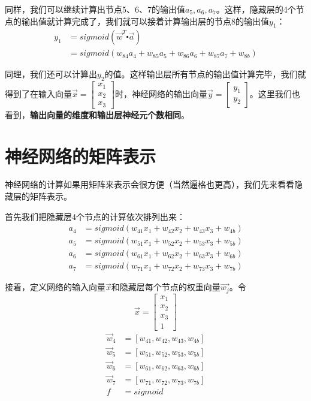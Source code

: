 同样，我们可以继续计算出节点5、6、7的输出值\(a_5,a_6,a_7\)。这样，隐藏层的4个节点的输出值就计算完成了，我们就可以接着计算输出层的节点8的输出值\(y_1\)：
\begin{align*}
	y_1 & =sigmoid(\vec{w}^T\centerdot\vec{a})                     \\
	    & =sigmoid(w_{84}a_4+w_{85}a_5+w_{86}a_6+w_{87}a_7+w_{8b})
\end{align*}

同理，我们还可以计算出\(y_2\)的值。这样输出层所有节点的输出值计算完毕，我们就得到了在输入向量\(\vec{x}=\begin{bmatrix}x_1\\x_2\\x_3\end{bmatrix}\)时，神经网络的输出向量\(\vec{y}=\begin{bmatrix}y_1\\y_2\end{bmatrix}\)。这里我们也看到，\textbf{输出向量的维度和输出层神经元个数相同}。


\section{神经网络的矩阵表示}\label{Bp:4}

神经网络的计算如果用矩阵来表示会很方便（当然逼格也更高），我们先来看看隐藏层的矩阵表示。

首先我们把隐藏层4个节点的计算依次排列出来：
\begin{align*}
	a_4 & =sigmoid(w_{41}x_1+w_{42}x_2+w_{43}x_3+w_{4b}) \\
	a_5 & =sigmoid(w_{51}x_1+w_{52}x_2+w_{53}x_3+w_{5b}) \\
	a_6 & =sigmoid(w_{61}x_1+w_{62}x_2+w_{63}x_3+w_{6b}) \\
	a_7 & =sigmoid(w_{71}x_1+w_{72}x_2+w_{73}x_3+w_{7b})
\end{align*}

接着，定义网络的输入向量\(\vec{x}\)和隐藏层每个节点的权重向量\(\vec{w_j}\)。令
\[\vec{x}=\begin{bmatrix}x_1\\x_2\\x_3\\1\end{bmatrix}\]
\begin{align*}
	\vec{w}_4 & =[w_{41},w_{42},w_{43},w_{4b}] \\
	\vec{w}_5 & =[w_{51},w_{52},w_{53},w_{5b}] \\
	\vec{w}_6 & =[w_{61},w_{62},w_{63},w_{6b}] \\
	\vec{w}_7 & =[w_{71},w_{72},w_{73},w_{7b}] \\
	f         & =sigmoid
\end{align*}


